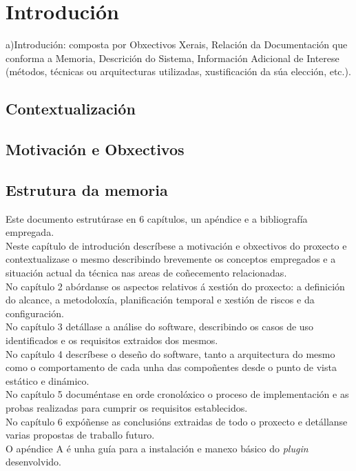 \chapter{Introdución}
a)Introdución:  composta  por  Obxectivos  Xerais,  Relación  da  Documentación  que  conforma  a 
Memoria,  Descrición  do  Sistema,  Información  Adicional  de  Interese  (métodos,  técnicas  ou 
arquitecturas utilizadas, xustificación da súa elección, etc.). 
 
\section{Contextualización}
\section{Motivación e Obxectivos}
\section{Estrutura da memoria}

Este documento estrutúrase en 6 capítulos, un apéndice e a bibliografía empregada.\\

Neste capítulo de introdución descríbese a motivación e obxectivos do proxecto e contextualizase o mesmo describindo brevemente os conceptos empregados e a situación actual da técnica nas areas de coñecemento relacionadas.\\

No capítulo 2 abórdanse os aspectos relativos á xestión do proxecto: a definición do alcance, a metodoloxía, planificación temporal e xestión de riscos e da configuración.\\

No capítulo 3 detállase a análise do software, describindo os casos de uso identificados e os requisitos extraidos dos mesmos.\\

No capítulo 4 descríbese o deseño do software, tanto a arquitectura do mesmo como o comportamento de cada unha das compoñentes desde o punto de vista estático e dinámico.\\

No capítulo 5 documéntase en orde cronolóxico o proceso de implementación e as probas realizadas para cumprir os requisitos establecidos.\\

No capítulo 6 expóñense as conclusións extraidas de todo o proxecto e detállanse varias propostas de traballo futuro.\\

O apéndice A é unha guía para a instalación e manexo básico do \emph{plugin} desenvolvido.\\
